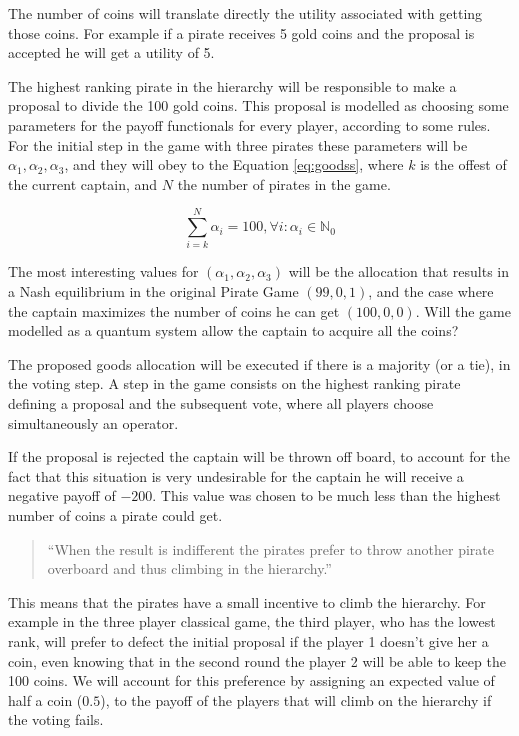 The number of coins will translate directly the utility associated with getting those coins. For example if a pirate receives 5 gold coins and the proposal is accepted he will get a utility of 5. 

The highest ranking pirate in the hierarchy will be responsible to make a proposal to divide the 100 gold coins. This proposal is modelled as choosing some parameters for the payoff functionals for every player, according to some rules. For the initial step in the game with three pirates these parameters will be $\alpha_{1}, \alpha_{2}, \alpha_{3}$, and they will obey to the Equation \ref{eq:goodss}, where $k$ is the offest of the current captain, and $N$ the number of pirates in the game. 

\begin{equation}
\label{eq:goodss}
\sum_{i=k}^{N}\alpha_{i}=100, \forall i :\alpha_{i}\in\mathbb{N}_{0}
\end{equation}

The most interesting values for $(\alpha_{1}, \alpha_{2}, \alpha_{3})$ will be the allocation that results in a Nash equilibrium in the original Pirate Game $(99, 0, 1)$, and the case where the captain maximizes the number of coins he can get $(100, 0, 0)$. Will the game modelled as a quantum system allow the captain to acquire all the coins?

The proposed goods allocation will be executed if there is a majority (or a tie), in the voting step. A step in the game consists on the highest ranking pirate defining a proposal and the subsequent vote, where all players choose simultaneously an operator. 

If the proposal is rejected the captain will be thrown off board, to account for the fact that this situation is very undesirable for the captain he will receive a negative payoff of $-200$. This value was chosen to be much less than the highest number of coins a pirate could get.

\begin{quotation}
``When the result is indifferent the pirates prefer to throw another pirate overboard and thus climbing in the hierarchy.''
\end{quotation}

This means that the pirates have a small incentive to climb the hierarchy. For example in the three player classical game, the third player, who has the lowest rank, will prefer to defect the initial proposal if the player 1 doesn't give her a coin, even knowing that in the second round the player 2 will be able to keep the 100 coins. We will account for this preference by assigning an expected value of half a coin ($0.5$), to the payoff of the players that will climb on the hierarchy if the voting fails.


